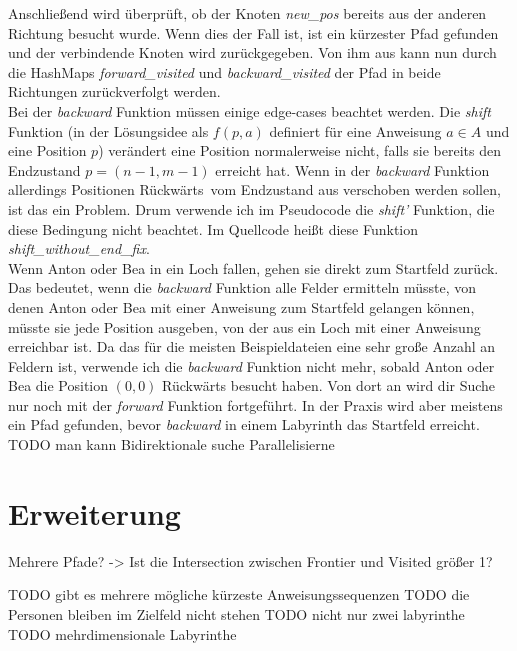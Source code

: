 \documentclass[a4paper,10pt,ngerman]{scrartcl}
\begin{document}
    Anschließend wird überprüft, ob der Knoten \textit{new\_pos} bereits aus der anderen Richtung besucht wurde. Wenn dies der Fall ist, ist ein kürzester Pfad gefunden und der verbindende Knoten wird zurückgegeben. Von ihm aus kann nun durch die HashMaps \textit{forward\_visited} und \textit{backward\_visited} der Pfad in beide Richtungen zurückverfolgt werden. \\
    Bei der \textit{backward} Funktion müssen einige edge-cases beachtet werden. Die \textit{shift} Funktion (in der Lösungsidee als $f(p,a)$ definiert für eine Anweisung $a \in A$ und eine Position $p$) verändert eine Position normalerweise nicht, falls sie bereits den Endzustand $p = (n-1, m-1)$ erreicht hat. Wenn in der \textit{backward} Funktion allerdings Positionen \glqq Rückwärts\grqq~vom Endzustand aus verschoben werden sollen, ist das ein Problem. Drum verwende ich im Pseudocode die \textit{shift'} Funktion, die diese Bedingung nicht beachtet. Im Quellcode heißt diese Funktion \textit{shift\_without\_end\_fix}. \\
    Wenn Anton oder Bea in ein Loch fallen, gehen sie direkt zum Startfeld zurück. Das bedeutet, wenn die \textit{backward} Funktion alle Felder ermitteln müsste, von denen Anton oder Bea mit einer Anweisung zum Startfeld gelangen können, müsste sie jede Position ausgeben, von der aus ein Loch mit einer Anweisung erreichbar ist. Da das für die meisten Beispieldateien eine sehr große Anzahl an Feldern ist, verwende ich die \textit{backward} Funktion nicht mehr, sobald Anton oder Bea die Position $(0,0)$ Rückwärts besucht haben. Von dort an wird dir Suche nur noch mit der \textit{forward} Funktion fortgeführt. In der Praxis wird aber meistens ein Pfad gefunden, bevor \textit{backward} in einem Labyrinth das Startfeld erreicht. \\

    TODO man kann Bidirektionale suche Parallelisierne


    \section{Erweiterung}
    Mehrere Pfade? -> Ist die Intersection zwischen Frontier und Visited größer 1?


    TODO gibt es mehrere mögliche kürzeste Anweisungssequenzen
    TODO die Personen bleiben im Zielfeld nicht stehen
    TODO nicht nur zwei labyrinthe
    TODO mehrdimensionale Labyrinthe
\end{document}
